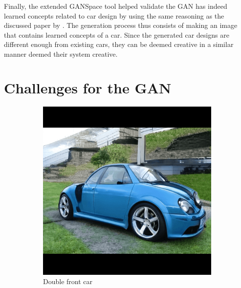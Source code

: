 Finally, the extended GANSpace tool helped validate the GAN has indeed learned concepts related to car design by using the same reasoning as the discussed paper by \citet{invidualunitanalysis}.
The generation process thus consists of making an image that contains learned concepts of a car.
Since the generated car designs are different enough from existing cars, they can be deemed creative in a similar manner \citet{creativecargan} deemed their system creative.



\section{Challenges for the GAN}
\label{sec:challenging_angle}

\begin{figure}
\centering
\begin{subfigure}{.3\textwidth}
  \centering
  \includegraphics[width=\textwidth]{images/double_front.png}
  \caption{Double front car}
  \label{fig:doublefront}
\end{subfigure}%
\hspace{.02\textwidth}
\begin{subfigure}{.3\textwidth}
  \centering

\end{subfigure}
\end{figure}
